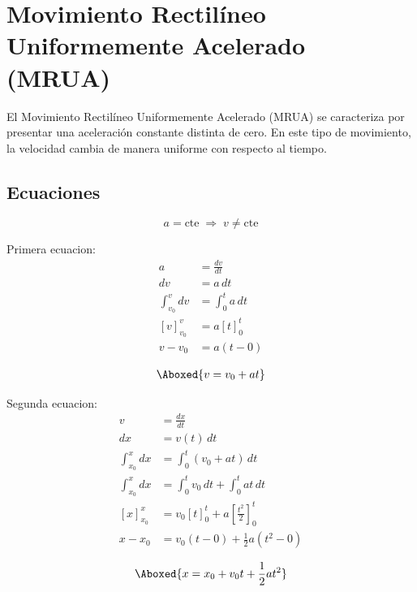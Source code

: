 \section{Movimiento Rectilíneo Uniformemente Acelerado (MRUA)}

El Movimiento Rectilíneo Uniformemente Acelerado (MRUA) se caracteriza por presentar una aceleración constante distinta de cero. En este tipo de movimiento, la velocidad cambia de manera uniforme con respecto al tiempo.

\subsection{Ecuaciones}
\vspace{-20pt}

\[
a=\text{cte} \;\Rightarrow\; v \neq \text{cte}
\]

\vspace{-20pt}

Primera ecuacion:
\begin{align*}
a &= \frac{dv}{dt}\\
dv &= a\,dt\\
\int_{v_0}^{v} dv &= \int_{0}^{t} a\,dt\\
\left[v\right]_{v_0}^{v} &= a\left[t\right]_{0}^{t}\\
v - v_0 &= a(t-0)
\end{align*}

\vspace{-30pt}

\begin{align*}
    \Aboxed{v = v_0 + at}
\end{align*}

Segunda ecuacion:
\begin{align*}
v &= \frac{dx}{dt}\\
dx &= v(t)\,dt\\
\int_{x_0}^{x} dx &= \int_{0}^{t} (v_0 + at)\,dt\\
\int_{x_0}^{x} dx &= \int_{0}^{t} v_0\,dt + \int_{0}^{t} at\,dt\\
\left[x\right]_{x_0}^{x} &= v_0\left[t\right]_{0}^{t} + a\left[\frac{t^2}{2}\right]_{0}^{t}\\
x - x_0 &= v_0(t-0) + \frac{1}{2}a(t^2-0)
\end{align*}

\vspace{-20pt}

\begin{align*}
    \Aboxed{x = x_0 + v_0 t + \frac{1}{2}at^2}
\end{align*}

